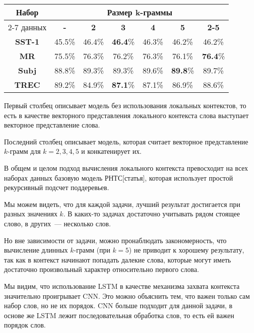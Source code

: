 \begin{minipage}{\linewidth}
 \label{tab:title} 
\begin{tabular}{|c|c|c|c|c|c|c|}
\hline
\multirow{2}{*}{Набор}   &         \multicolumn{6}{c|}{Размер k-граммы} \\ \cline{2-7} 
     данных              & \textbf{-} & \textbf{2} & \textbf{3} & \textbf{4} & \textbf{5} & \textbf{2-5} \\ \hline
\textbf{SST-1}           &  45.5\%    & 46.4\%     &\textbf{46.4}\%& 46.3\%     &  46.2\%    & 46.2\%           \\  \hline
\textbf{MR}              &  75.5\%    & 76.3\%     & 76.2\%     & 76.3\%     & 76.1\%     & \textbf{76.4}\% \\ \hline
\textbf{Subj}            &  88.8\%    & 89.3\%     & 89.3\%     & 89.6\%     &\textbf{89.8}\%    & 89.7\% \\ \hline
\textbf{TREC}            &  89.2\%    & 84.9\%     & \textbf{87.1}\%     & 87.1\%     &  86.9\%    & 88.6\%  \\ \hline
\end{tabular}
\vspace{5mm}
\end{minipage}
\vspace{5mm}

Первый столбец описывает модель без использования локальных контекстов, то есть в качестве векторного представления локального контекста слова выступает векторное представление слова.

Последний столбец описывает модель, которая считает векторное представление $k$-грамм для $k=2,3,4,5$ и конкатенирует их.

В общем и целом подход вычисления локального контекста превосходит на всех наборах данных базовую модель РНТС[статья], которая использует простой рекурсивный подсчет поддеревьев.

Мы можем видеть, что для каждой задачи, лучший результат достигается при разных значениях $k$. В каких-то задачах достаточно учитывать рядом стоящее слово, в других~--- несколько слов.

Но вне зависимости от задачи, можно пронаблюдать закономерность, что 
вычисление длинных $k$-грамм (при $k=5$) не приводит к хорошему результату, 
так как в контекст начинают попадать далекие слова, 
которые могут иметь достаточно произвольный характер относительно первого слова.

Мы видим, что использование LSTM в качестве механизма захвата контекста значительно проигрывает CNN.
Это можно объяснить тем, что важен только сам набор слов, но не их порядок. 
CNN больше подходит для данной задачи, в основе же LSTM лежит последовательная обработка слов, то есть ей важен порядок слов.


